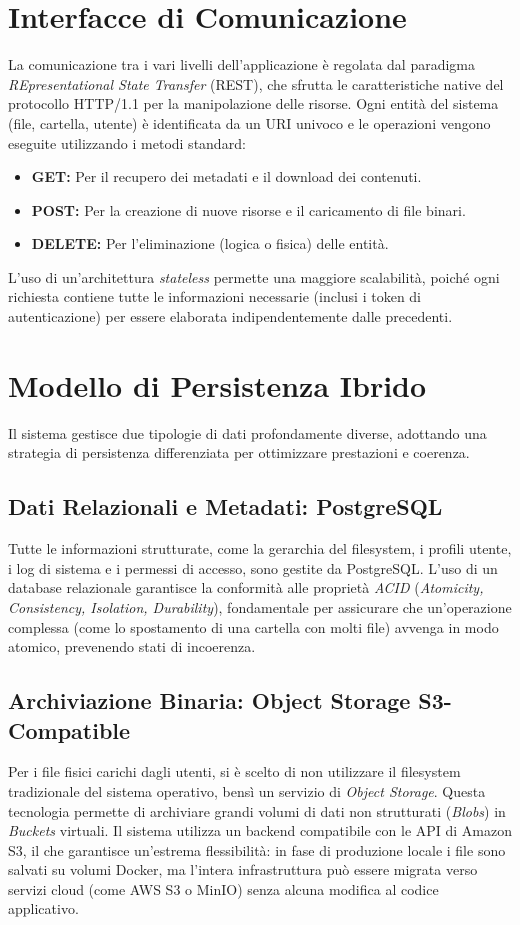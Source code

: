 \documentclass[12pt,a4paper]{report}
\begin{document}
\section{Interfacce di Comunicazione}
La comunicazione tra i vari livelli dell'applicazione è regolata dal paradigma
\textit{REpresentational State Transfer} (REST), che sfrutta le caratteristiche
native del protocollo HTTP/1.1 per la manipolazione delle risorse. Ogni entità
del sistema (file, cartella, utente) è identificata da un URI univoco e le
operazioni vengono eseguite utilizzando i metodi standard:
\begin{itemize}
  \item \textbf{GET:} Per il recupero dei metadati e il download dei contenuti.
  \item \textbf{POST:} Per la creazione di nuove risorse e il caricamento di
    file binari.
  \item \textbf{DELETE:} Per l'eliminazione (logica o fisica) delle entità.
\end{itemize}
L'uso di un'architettura \textit{stateless} permette una maggiore scalabilità,
poiché ogni richiesta contiene tutte le informazioni necessarie (inclusi i
token di autenticazione) per essere elaborata indipendentemente dalle
precedenti.

\newpage
\section{Modello di Persistenza Ibrido}
Il sistema gestisce due tipologie di dati profondamente diverse, adottando una
strategia di persistenza differenziata per ottimizzare prestazioni e coerenza.

\subsection{Dati Relazionali e Metadati: PostgreSQL}
Tutte le informazioni strutturate, come la gerarchia del filesystem, i profili
utente, i log di sistema e i permessi di accesso, sono gestite da PostgreSQL.
L'uso di un database relazionale garantisce la conformità alle proprietà
\textit{ACID} (\textit{Atomicity, Consistency, Isolation, Durability}),
fondamentale per assicurare che un'operazione complessa (come lo spostamento di
una cartella con molti file) avvenga in modo atomico, prevenendo stati di
incoerenza.

\subsection{Archiviazione Binaria: Object Storage S3-Compatible}
Per i file fisici carichi dagli utenti, si è scelto di non utilizzare il
filesystem tradizionale del sistema operativo, bensì un servizio di
\textit{Object Storage}. Questa tecnologia permette di archiviare grandi
volumi di dati non strutturati (\textit{Blobs}) in \textit{Buckets} virtuali.
Il sistema utilizza un backend compatibile con le API di Amazon S3, il che
garantisce un'estrema flessibilità: in fase di produzione locale i file sono
salvati su volumi Docker, ma l'intera infrastruttura può essere migrata verso
servizi cloud (come AWS S3 o MinIO) senza alcuna modifica al codice applicativo.
\end{document}
